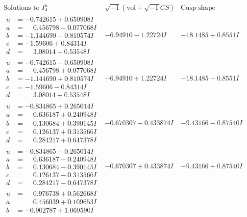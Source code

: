 \documentclass[1p]{elsarticle_modified}
\theoremstyle{definition}
\newcommand{\I}{\sqrt{-1}}
\begin{document}
$$\begin{array}{c|c|c}  
\text{Solutions to }I^u_{4}& \I (\text{vol} + \sqrt{-1}CS) & \text{Cusp shape}\\
 \hline 
\begin{aligned}
u &= -0.742615 + 0.650908 I \\
a &= \phantom{-}0.456798 - 0.077068 I \\
b &= -1.144690 - 0.810574 I \\
c &= -1.59606 + 0.84314 I \\
d &= \phantom{-}3.08014 - 0.53548 I\end{aligned}
 & -6.94910 - 1.22724 I & -18.1485 + 0.8551 I \\ \hline\begin{aligned}
u &= -0.742615 - 0.650908 I \\
a &= \phantom{-}0.456798 + 0.077068 I \\
b &= -1.144690 + 0.810574 I \\
c &= -1.59606 - 0.84314 I \\
d &= \phantom{-}3.08014 + 0.53548 I\end{aligned}
 & -6.94910 + 1.22724 I & -18.1485 - 0.8551 I \\ \hline\begin{aligned}
u &= -0.834865 + 0.265014 I \\
a &= \phantom{-}0.636187 + 0.240948 I \\
b &= \phantom{-}0.130684 + 0.390145 I \\
c &= \phantom{-}0.126137 + 0.313566 I \\
d &= \phantom{-}0.284217 + 0.647378 I\end{aligned}
 & -0.670307 - 0.433874 I & -9.43166 - 0.87540 I \\ \hline\begin{aligned}
u &= -0.834865 - 0.265014 I \\
a &= \phantom{-}0.636187 - 0.240948 I \\
b &= \phantom{-}0.130684 - 0.390145 I \\
c &= \phantom{-}0.126137 - 0.313566 I \\
d &= \phantom{-}0.284217 - 0.647378 I\end{aligned}
 & -0.670307 + 0.433874 I & -9.43166 + 0.87540 I \\ \hline\begin{aligned}
u &= \phantom{-}0.976738 + 0.562668 I \\
a &= \phantom{-}0.456039 + 0.109653 I \\
b &= -0.902787 + 1.069590 I \\

\end{aligned}
\end{array}$$
\end{document}
